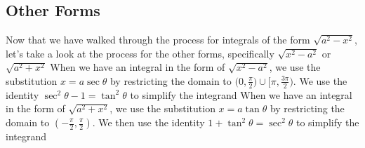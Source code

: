 \documentclass{report}
\begin{document}
   \subsection*{Other Forms}
   \bigbreak \noindent 
   Now that we have walked through the process for integrals of the form $\sqrt{a^{2} - x^{2}}$, let's take a look at the process for the other forms, specifically $\sqrt{x^{2} - a^{2}}$ or $\sqrt{a^{2} + x^{2}}$
   \bigbreak \noindent 
   When we have an integral in the form of $\sqrt{x^{2} - a^{2}}$, we use the substitution $x=a\sec{\theta }$ by restricting the domain to $\bigg(0,\frac{\pi}{2}\bigg)\cup \bigg[\pi, \frac{3\pi}{2}\bigg) $. We use the identity  $\sec^{2}{\theta } - 1 = \tan^{2}{\theta } $ to simplify the integrand
   \bigbreak \noindent 
   When we have  an integral in the form of $\sqrt{a^{2} + x^{2}}$, we use the substitution $x=a\tan{\theta }$ by restricting the domain to $\left(-\frac{\pi}{2}, \frac{\pi}{2}\right) $. We then use the identity $1+\tan^{2}{\theta } = \sec^{2}{\theta }$ to simplify the integrand




    


        

        


        
        

    
    
    
\end{document}
